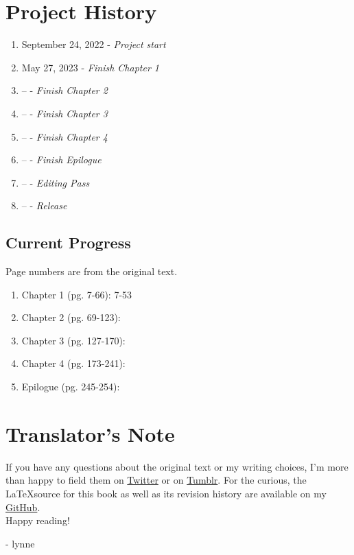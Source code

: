 \section*{Project History}
\begin{enumerate}
	\item September 24, 2022 - \emph{Project start}
	\item May 27, 2023 - \emph{Finish Chapter 1}
	\item -- - \emph{Finish Chapter 2}
	\item -- - \emph{Finish Chapter 3}
	\item -- - \emph{Finish Chapter 4}
	\item -- - \emph{Finish Epilogue}
	\item -- - \emph{Editing Pass}
	\item -- - \emph{Release}
\end{enumerate}
\subsection*{Current Progress}
Page numbers are from the original text.
\begin{enumerate}
	\item Chapter 1 (pg. 7-66): 7-53
	\item Chapter 2 (pg. 69-123):
	\item Chapter 3 (pg. 127-170):
	\item Chapter 4 (pg. 173-241):
	\item Epilogue (pg. 245-254):
\end{enumerate}

\section*{Translator's Note}
If you have any questions about the original text or my writing choices, I'm more than happy to field them on \href{https://twitter.com/plvpwaa}{Twitter} or on \href{https://plvpwaa.tumblr.com}{Tumblr}.
For the curious, the \LaTeX \space source for this book as well as its revision history are available on my \href{https://github.com/Spirati/translation-octopath}{GitHub}. 
\\

Happy reading!

- lynne